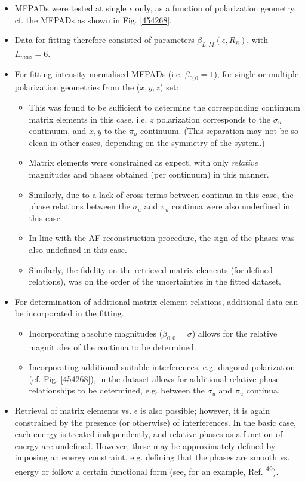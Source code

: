\documentclass[10pt]{article}
\begin{document}
\begin{itemize}
\item MFPADs were tested at single $\epsilon$ only, as a function of polarization geometry, cf. the MFPADs as shown in Fig. \ref{454268}.
\item Data for fitting therefore consisted of parameters $\beta_{L,M}(\epsilon,R_{\hat{n}})$, with $L_{max}=6$.
\item For fitting intensity-normalised MFPADs (i.e. $\beta_{0,0}=1$), for single or multiple polarization geometries from the ($x,y,z$) set:
\begin{itemize}
\item This was found to be sufficient to determine the corresponding continuum matrix elements in this case, i.e. $z$ polarization corresponds to the $\sigma_u$ continuum, and $x,y$ to the $\pi_u$ continuum. (This separation may not be so clean in other cases, depending on the symmetry of the system.)
\item Matrix elements were constrained as expect, with only \textit{relative} magnitudes and phases obtained (per continuum) in this manner.
\item Similarly, due to a lack of cross-terms between continua in this case, the phase relations between the $\sigma_u$ and $\pi_u$ continua were also underfined in this case.
\item In line with the AF reconstruction procedure, the sign of the phases was also undefined in this case.
\item Similarly, the fidelity on the retrieved matrix elements (for defined relations), was on the order of the uncertainties in the fitted dataset.
\end{itemize}
\item For determination of additional matrix element relations, additional data can be incorporated in the fitting.
\begin{itemize}
\item Incorporating absolute magnitudes ($\beta_{0,0}=\sigma$) allows for the relative magnitudes of the continua to be determined.
\item Incorporating additional suitable interferences, e.g. diagonal polarization (cf. Fig. \ref{454268}), in the dataset allows for additional relative phase relationships to be determined, e.g. between the $\sigma_u$ and $\pi_u$ continua.
\end{itemize}
\item Retrieval of matrix elements vs. $\epsilon$ is also possible; however, it is again constrained by the presence (or otherwise) of interferences. In the basic case, each energy is treated independently, and relative phases as a function of energy are undefined. However, these may be approximately defined by imposing an energy constraint, e.g. defining that the phases are smooth vs. energy or follow a certain functional form (see, for an example, Ref. \textsuperscript{\hyperref[csl:49]{49}}). %
\end{itemize}
\end{document}
